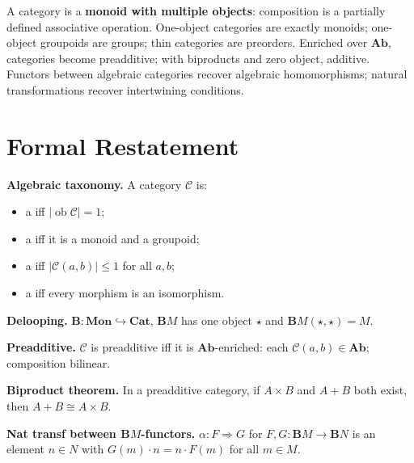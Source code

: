 \begin{summarybox}
A category is a \textbf{monoid with multiple objects}: composition is a partially
defined associative operation. One-object categories are exactly monoids; one-object
groupoids are groups; thin categories are preorders. Enriched over $\mathbf{Ab}$,
categories become preadditive; with biproducts and zero object, additive. Functors
between algebraic categories recover algebraic homomorphisms; natural transformations
recover intertwining conditions.
\end{summarybox}

\section{Formal Restatement}

\begin{formalrestatement}
\textbf{Algebraic taxonomy.}
A category $\mathcal{C}$ is:
\begin{itemize}
  \item a  iff $|\operatorname{ob}\mathcal{C}| = 1$;
  \item a  iff it is a monoid and a groupoid;
  \item a  iff $|\mathcal{C}(a,b)| \leq 1$ for all $a,b$;
  \item a  iff every morphism is an isomorphism.
\end{itemize}

\textbf{Delooping.} $\mathbf{B} : \mathbf{Mon} \hookrightarrow \mathbf{Cat}$,
$\mathbf{B}M$ has one object $\star$ and $\mathbf{B}M(\star,\star) = M$.

\textbf{Preadditive.} $\mathcal{C}$ is preadditive iff it is $\mathbf{Ab}$-enriched:
each $\mathcal{C}(a,b) \in \mathbf{Ab}$; composition bilinear.

\textbf{Biproduct theorem.} In a preadditive category, if $A\times B$ and $A+B$
both exist, then $A+B \cong A\times B$.

\textbf{Nat transf between $\mathbf{B}M$-functors.} $\alpha : F \Rightarrow G$
for $F, G : \mathbf{B}M \to \mathbf{B}N$ is an element $n \in N$ with
$G(m) \cdot n = n \cdot F(m)$ for all $m \in M$.
\end{formalrestatement}
